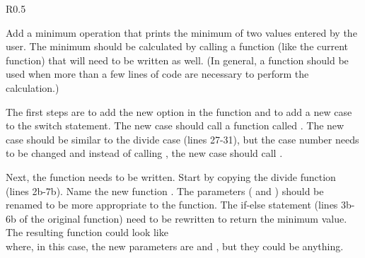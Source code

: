 \begin{wrapfigure}{R}{0.5\textwidth} 
\vspace{-0.0cm}
\end{wrapfigure}

Add a minimum operation that prints the minimum of two values entered by the user.  The minimum should be calculated by calling a function (like the current  function) that will need to be written as well.  (In general, a function should be used when more than a few lines of code are necessary to perform the calculation.)

The first steps are to add the new option in the  function and to add a new case to the switch statement.  The new case should call a function called .  The new case should be similar to the divide case (lines 27-31), but the case number needs to be changed and instead of calling  , the new case should call .  

Next, the  function needs to be written.  Start by copying the divide function (lines 2b-7b).  Name the new function .  The parameters ( and ) should be renamed to be more appropriate to the function.  The if-else statement (lines 3b-6b of the original function) need to be rewritten to return the minimum value.  The resulting function could look like\\
where, in this case, the new parameters are  and , but they could be anything. 

